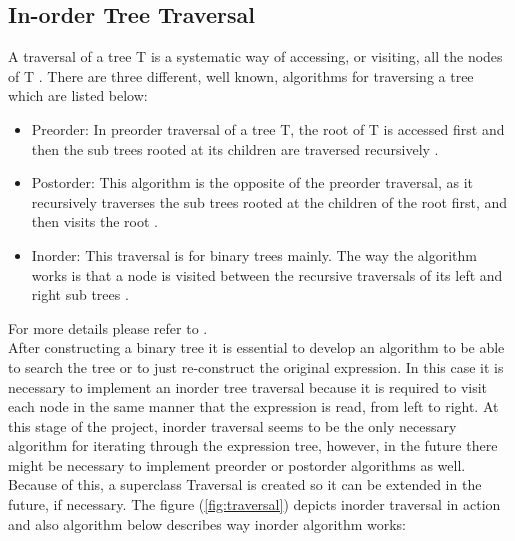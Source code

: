 \documentclass[10pt, a4paper, titlepage]{article}
\begin{document}
\subsection{In-order Tree Traversal}
\label{inorder}
A traversal of a tree T is a systematic way of accessing, or visiting, all the nodes of T \cite{algo_book}. There are three different, well known, algorithms for traversing a tree which are listed below:
\begin{itemize}
\item Preorder: In preorder traversal of a tree T, the root of T is accessed first and then the sub trees rooted at its children are traversed recursively \cite{algo_book}. 
\item Postorder: This algorithm is the opposite of the preorder traversal, as it recursively traverses the sub trees rooted at the children of the root first, and then visits the root \cite{algo_book}.
\item Inorder: This traversal is for binary trees mainly. The way the algorithm works is that a node is visited between the recursive traversals of its left and right sub trees \cite{algo_book}.
\end{itemize}
For more details please refer to \cite{algo_book}.\\

After constructing a binary tree it is essential to develop an algorithm to be able to search the tree or to just re-construct the original expression. In this case it is necessary to implement an inorder tree traversal because it is required to visit each node in the same manner that the expression is read, from left to right. At this stage of the project, inorder traversal seems to be the only necessary algorithm for iterating through the expression tree, however, in the future there might be necessary to implement preorder or postorder algorithms as well. Because of this, a superclass Traversal is created so it can be extended in the future, if necessary. The figure (\ref{fig:traversal}) depicts inorder traversal in action and also algorithm below describes way inorder algorithm works:
\end{document}
